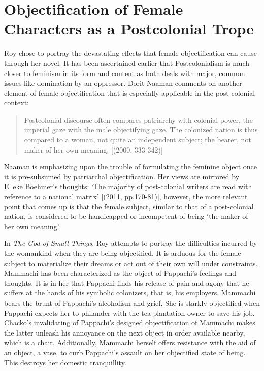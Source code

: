 \section{Objectification of Female Characters as a Postcolonial Trope}

Roy chose to portray the devastating effects that female objectification can cause through her novel. It has been ascertained earlier that Postcolonialism is much closer to feminism in its form and content as both deals with major, common issues like domination by an oppressor. Dorit Naaman comments on another element of female objectification that is especially applicable in the post-colonial context:

\begin{quote}
  Postcolonial discourse often compares patriarchy with colonial power, the imperial gaze with the male objectifying gaze. The colonized nation is thus compared to a woman, not quite an independent subject; the bearer, not maker of her own meaning. [(2000, 333-342)] 
\end{quote}

Naaman is emphasizing upon the trouble of formulating the feminine object once it is pre-subsumed by patriarchal objectification. Her views are mirrored by Elleke Boehmer’s thoughts: ‘The majority of post-colonial writers are read with reference to a national matrix’ [(2011, pp.170-81)], however, the more relevant point that comes up is that the female subject, similar to that of a post-colonial nation, is considered to be handicapped or incompetent of being ‘the maker of her own meaning’.

In \emph{The God of Small Things}, Roy attempts to portray the difficulties incurred by the womankind when they are being objectified. It is arduous for the female subject to materialize their dreams or act out of their own will under constraints. Mammachi has been characterized as the object of Pappachi’s feelings and thoughts. It is in her that Pappachi finds his release of pain and agony that he suffers at the hands of his symbolic colonizers, that is, his employers. Mammachi bears the brunt of Pappachi’s alcoholism and grief. She is starkly objectified when Pappachi expects her to philander with the tea plantation owner to save his job. Chacko’s invalidating of Pappachi’s designed objectification of Mammachi makes the latter unleash his annoyance on the next object in order available nearby, which is a chair. Additionally, Mammachi herself offers resistance with the aid of an object, a vase, to curb Pappachi’s assault on her objectified state of being. This destroys her domestic tranquillity. 

